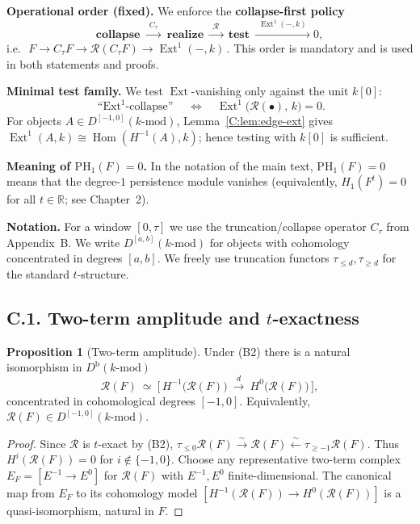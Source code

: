 \documentclass[11pt]{article}
\numberwithin{equation}{section}
\theoremstyle{plain}
\theoremstyle{definition}
\theoremstyle{remark}
\DeclareMathOperator{\Ext}{Ext}
\DeclareMathOperator{\Hom}{Hom}
\theoremstyle{plain}
\theoremstyle{definition}
\numberwithin{equation}{section}
\newtheorem{proposition}[theorem]{Proposition}
\theoremstyle{definition}
\numberwithin{equation}{section}
\theoremstyle{plain}
\theoremstyle{definition}
\theoremstyle{remark}
\begin{document}
\smallskip
\noindent\textbf{Operational order (fixed).}
We enforce the \textbf{collapse-first policy}
\[
\textbf{collapse}\ \xrightarrow{\ \ C_\tau\ \ } \ \textbf{realize}\ \xrightarrow{\ \ \mathcal{R}\ \ } \ \textbf{test}\ \xrightarrow{\ \ \Ext^1(-,k)\ \ } 0,
\]
i.e.\ \(\,F\to C_\tau F\to \mathcal{R}(C_\tau F)\to \Ext^1(-,k)\,\).
This order is mandatory and is used in both statements and proofs.

\smallskip
\noindent\textbf{Minimal test family.}
We test \(\Ext\)-vanishing only against the unit \(k[0]\):
\[
\text{``\(\Ext^1\)-collapse''}\quad\Longleftrightarrow\quad\Ext^1\!\big(\mathcal{R}(\bullet),\,k\big)=0.
\]
For objects \(A\in D^{[-1,0]}(k\text{-mod})\), Lemma~\ref{C:lem:edge-ext} gives
\(\Ext^1(A,k)\cong \Hom(H^{-1}(A),k)\); hence testing with \(k[0]\) is sufficient.

\smallskip
\noindent\textbf{Meaning of \(\mathrm{PH}_1(F)=0\).}
In the notation of the main text, \(\mathrm{PH}_1(F)=0\) means that the degree-\(1\) persistence module vanishes (equivalently, \(H_1(F^t)=0\) for all \(t\in\mathbb{R}\); see Chapter~2).

\medskip
\noindent\textbf{Notation.}
For a window \([0,\tau]\) we use the truncation/collapse operator \(C_\tau\) from Appendix~B.
We write \(D^{[a,b]}(k\text{-mod})\) for objects with cohomology concentrated in degrees \([a,b]\).
We freely use truncation functors \(\tau_{\leq d},\tau_{\geq d}\) for the standard \(t\)-structure.

\subsection*{C.1. Two-term amplitude and $t$-exactness}

\begin{proposition}[Two-term amplitude]\label{C:prop:two-term}
Under \textup{(B2)} there is a natural isomorphism in \(D^{\mathrm{b}}(k\text{-mod})\)
\[
\mathcal{R}(F)\ \simeq\ \Big[\, H^{-1}\!\big(\mathcal{R}(F)\big)\ \xrightarrow{\,d\,}\ H^{0}\!\big(\mathcal{R}(F)\big)\,\Big],
\]
concentrated in cohomological degrees \([-1,0]\).
Equivalently, \(\mathcal{R}(F)\in D^{[-1,0]}(k\text{-mod})\).
\end{proposition}

\begin{proof}
Since \(\mathcal{R}\) is \(t\)-exact by \textup{(B2)}, \(\tau_{\le 0}\mathcal{R}(F)\xrightarrow{\sim}\mathcal{R}(F)\xleftarrow{\sim}\tau_{\ge -1}\mathcal{R}(F)\).
Thus \(H^i(\mathcal{R}(F))=0\) for \(i\notin\{-1,0\}\).
Choose any representative two-term complex \(E_F=[E^{-1}\to E^0]\) for \(\mathcal{R}(F)\) with \(E^{-1},E^0\) finite-dimensional.
The canonical map from \(E_F\) to its cohomology model \([H^{-1}(\mathcal{R}(F))\to H^0(\mathcal{R}(F))]\) is a quasi-isomorphism, natural in \(F\).
\end{proof}
\end{document}
